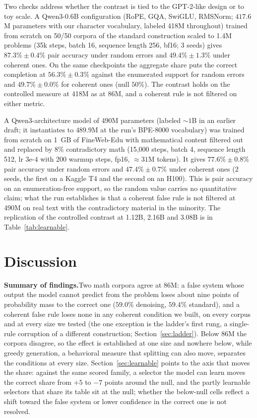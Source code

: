 \documentclass{article}
\begin{document}
Two checks address whether the contrast is tied to the GPT-2-like design or to toy scale. A Qwen3-0.6B configuration \citep{yang2025qwen3} (RoPE, GQA, SwiGLU, RMSNorm; $417.6$M parameters with our character vocabulary, labeled 418M throughout) trained from scratch on 50/50 corpora of the standard construction scaled to 1.4M problems (35k steps, batch 16, sequence length 256, bf16; 3 seeds) gives $87.3\% \pm 0.4\%$ pair accuracy under random errors and $49.4\% \pm 1.3\%$ under coherent ones. On the same checkpoints the aggregate share puts the correct completion at $56.3\% \pm 0.3\%$ against the enumerated support for random errors and $49.7\% \pm 0.0\%$ for coherent ones (null $50\%$). The contrast holds on the controlled measure at 418M as at 86M, and a coherent rule is not filtered on either metric.

A Qwen3-architecture model of 490M parameters (labeled ${\sim}1$B in an earlier draft; it instantiates to $489.9$M at the run's BPE-8000 vocabulary) was trained from scratch on 1~GB of FineWeb-Edu \citep{penedo2024fineweb} with mathematical content filtered out and replaced by 8\% contradictory math (15{,}000 steps, batch 4, sequence length 512, lr $3\text{e-}4$ with 200 warmup steps, fp16, ${\approx}31$M tokens). It gives $77.6\% \pm 0.8\%$ pair accuracy under random errors and $47.4\% \pm 0.7\%$ under coherent ones (2 seeds, the first on a Kaggle T4 and the second on an H100). This is pair accuracy on an enumeration-free support, so the random value carries no quantitative claim; what the run establishes is that a coherent false rule is not filtered at 490M on real text with the contradictory material in the minority. The replication of the controlled contrast at 1.12B, 2.16B and 3.08B is in Table~\ref{tab:learnable}.

\section{Discussion}
\label{sec:discussion}

\textbf{Summary of findings.}\quad Two math corpora agree at 86M: a false system whose output the model cannot predict from the problem loses about nine points of probability mass to the correct one ($59.0\%$ denoising, $59.4\%$ standard), and a coherent false rule loses none in any coherent condition we built, on every corpus and at every size we tested (the one exception is the ladder's first rung, a single-rule corruption of a different construction; Section~\ref{sec:ladder}). Below 86M the corpora disagree, so the effect is established at one size and nowhere below, while greedy generation, a behavioral measure that splitting can also move, separates the conditions at every size. Section~\ref{sec:learnable} points to the axis that moves the share: against the same scored family, a selector the model can learn moves the correct share from ${+}5$ to ${-}7$ points around the null, and the partly learnable selectors that share its table sit at the null; whether the below-null cells reflect a shift toward the false system or lower confidence in the correct one is not resolved.
\end{document}
